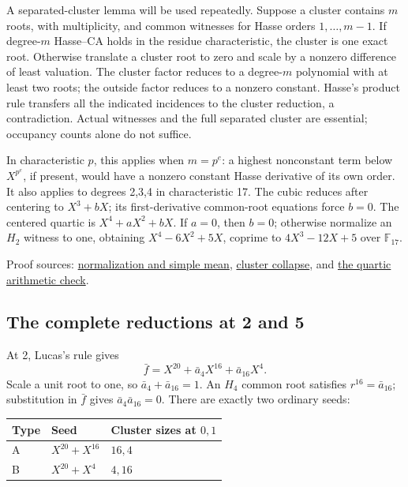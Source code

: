 \documentclass[
  british,
  10pt,
]{article}
\newcounter{none} %
\begin{document}
A separated-cluster lemma will be used repeatedly. Suppose a cluster
contains \(m\) roots, with multiplicity, and common witnesses for Hasse
orders \(1,\ldots,m-1\). If degree-\(m\) Hasse--CA holds in the residue
characteristic, the cluster is one exact root. Otherwise translate a
cluster root to zero and scale by a nonzero difference of least
valuation. The cluster factor reduces to a degree-\(m\) polynomial with
at least two roots; the outside factor reduces to a nonzero constant.
Hasse's product rule transfers all the indicated incidences to the
cluster reduction, a contradiction. Actual witnesses and the full
separated cluster are essential; occupancy counts alone do not suffice.

In characteristic \(p\), this applies when \(m=p^e\): a highest
nonconstant term below \(X^{p^e}\), if present, would have a nonzero
constant Hasse derivative of its own order. It also applies to degrees
2,3,4 in characteristic 17. The cubic reduces after centering to
\(X^3+bX\); its first-derivative common-root equations force \(b=0\).
The centered quartic is \(X^4+aX^2+bX\). If \(a=0\), then \(b=0\);
otherwise normalize an \(H_2\) witness to one, obtaining
\(X^4-6X^2+5X\), coprime to \(4X^3-12X+5\) over \(\mathbb F_{17}\).

Proof sources:
\href{evidence/full/LIFT_CONSEQUENCES_17.md}{normalization and simple
mean}, \href{evidence/full/two_adic/CLUSTER_COLLAPSE.md}{cluster
collapse}, and
\href{evidence/full/wild17/blowup/m4/check_lift_consequences.py}{the
quartic arithmetic check}.

\subsection{The complete reductions at 2 and
5}\label{the-complete-reductions-at-2-and-5}

At 2, Lucas's rule gives \[
 \bar f=X^{20}+\bar a_4X^{16}+\bar a_{16}X^4.
\] Scale a unit root to one, so \(\bar a_4+\bar a_{16}=1\). An \(H_4\)
common root satisfies \(r^{16}=\bar a_{16}\); substitution in \(\bar f\)
gives \(\bar a_4\bar a_{16}=0\). There are exactly two ordinary seeds:

{\def\LTcaptype{none} %
\begin{longtable}[]{@{}lll@{}}
\toprule\noalign{}
Type & Seed & Cluster sizes at \(0,1\) \\
\midrule\noalign{}
\endhead
\bottomrule\noalign{}
\endlastfoot
A & \(X^{20}+X^{16}\) & \(16,4\) \\
B & \(X^{20}+X^4\) & \(4,16\) \\
\end{longtable}
}
\end{document}

